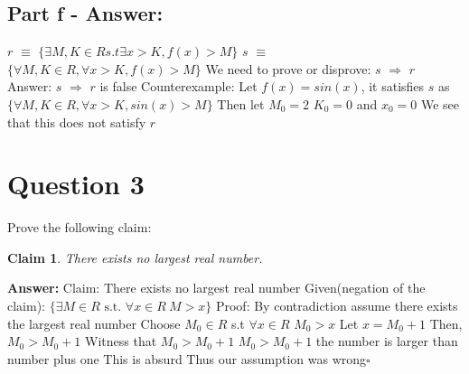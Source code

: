 \documentclass[12pt]{article}
\newtheorem*{claim}{Claim}
\begin{document}
\subsection*{Part f - Answer:}
{
$r$ $\equiv$ $\{\exists M,K \in R s.t \exists x>K, f(x)>M\}$\newline
 \newline
$s$ $\equiv$ $\{\forall M,K \in R, \forall x>K,f(x)>M\}$\newline
We need to prove or disprove: $s$ $\Rightarrow$ $r$\newline
Answer: $s$ $\Rightarrow$ $r$ is false\newline
Counterexample: Let $f(x)= sin(x)$, it satisfies $s$\newline
as $\{\forall M,K \in R, \forall x>K,sin(x)>M\}$
Then let $M_{0}=2$ $K_{0}=0$ and $x_{0}=0$\newline
We see that this does not satisfy $r$
}

\newpage
\section*{Question 3}

Prove the following claim:
\begin{claim}
There exists no largest real number.
\end{claim}

{\noindent\bf Answer:}
{
 \newline
 \newline
Claim: There exists no largest real number\newline
 \newline
Given(negation of the claim):  $\{\exists M\in R\text{ s.t. } \forall x\in R\ M>x \}$\newline
 \newline
Proof: By contradiction assume there exists the largest real number\newline
Choose $M_{0}\in R$ s.t $\forall x\in R$ $M_{0}>x$\newline
Let $x=M_{0}+1$\newline
Then, $M_{0}>M_{0}+1$\newline
Witness that $M_{0}>M_{0}+1$\newline
$M_{0}>M_{0}+1$ the number is larger than number plus one\newline
This is absurd\newline
Thus our assumption was wrong$\square$\newline
}
\newpage
\end{document}
